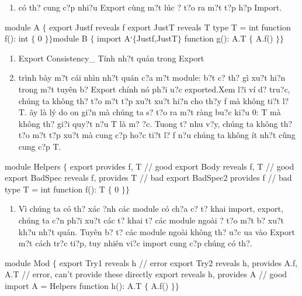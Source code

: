 \documentclass{article} %
\begin{document}
\begin{enumerate}
\item  c\'{o} th? cung c?p nhi?u Export c\`{u}ng m?t l\'{u}c {\dj}? t?o ra m?t t?p h?p Import.
\end{enumerate}

\noindent module A $\{$  export Justf reveals f  export JustT reveals T  type T = int  function f(): int $\{$ 0 $\}$$\}$module B $\{$  import A`$\{$Justf,JustT$\}$  function g(): A.T $\{$ A.f() $\}$$\}$

\begin{enumerate}
\item  Export Consistency\_ T\'{i}nh nh?t qu\'{a}n trong Export

\item  tr\`{i}nh b\`{a}y m?t c\'{a}i nh\`{i}n nh?t qu\'{a}n c?a m?t module:  b?t c? th? g\`{i} xu?t hi?n trong m?t tuy\^{e}n b? Export ch\'{i}nh n\'{o} ph?i {\dj}u?c exported.Xem l?i v\'{i} d? tru?c, ch\'{u}ng ta kh\^{o}ng th? t?o m?t t?p xu?t xu?t hi?n cho th?y f m\`{a} kh\^{o}ng ti?t l? T. {\DJ}\^{a}y l\`{a} l\'{y} do {\dj}on gi?n m\`{a} ch\'{u}ng ta s? t?o ra m?t r\`{a}ng bu?c ki?u 0: T m\`{a} kh\^{o}ng th? gi?i quy?t n?u T l\`{a} m? {\dj}?c. Tuong t? nhu v?y, ch\'{u}ng ta kh\^{o}ng th? t?o m?t t?p xu?t m\`{a} cung c?p ho?c ti?t l? f n?u ch\'{u}ng ta kh\^{o}ng \'{i}t nh?t c\~{u}ng cung c?p T.
\end{enumerate}

\noindent module Helpers $\{$  export provides f, T // good  export Body reveals f, T // good  export BadSpec reveals f, provides T // bad  export BadSpec2 provides f // bad  type T = int  function f(): T $\{$ 0 $\}$$\}$

\begin{enumerate}
\item  V\`{i} ch\'{u}ng ta c\'{o} th? x\'{a}c {\dj}?nh c\'{a}c module c\'{o} ch?a c? t? khai import, export, ch\'{u}ng ta c?n ph?i xu?t c\'{a}c t? khai t? c\'{a}c module ngo\`{a}i {\dj}? t?o m?t b? xu?t kh?u nh?t qu\'{a}n. Tuy\^{e}n b? t? c\'{a}c module ngo\`{a}i kh\^{o}ng th? {\dj}u?c {\dj}ua v\`{a}o Export m?t c\'{a}ch tr?c ti?p, tuy nhi\^{e}n vi?c import cung c?p ch\'{u}ng c\'{o} th?.
\end{enumerate}

\noindent 

\noindent module Mod $\{$  export Try1 reveals h // error  export Try2 reveals h, provides A.f, A.T // error, can't provide these directly  export reveals h, provides A // good  import A = Helpers  function h(): A.T $\{$ A.f() $\}$$\}$
\end{document}
